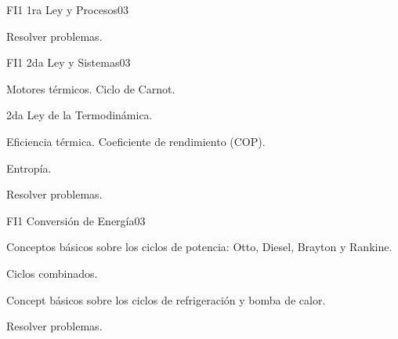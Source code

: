 \begin{syllabus}
\begin{unit}{FI1 1ra Ley y Procesos}{}{0}{3}
   \begin{learningoutcomes}
      \item Resolver problemas.
   \end{learningoutcomes}
\end{unit}

\begin{unit}{FI1 2da Ley y Sistemas}{}{0}{3}
\begin{topics}
      \item Motores térmicos. Ciclo de Carnot.
      \item 2da Ley de la Termodinámica.
      \item Eficiencia térmica. Coeficiente de rendimiento (COP).
      \item Entropía.
      
%       
   \end{topics}

   \begin{learningoutcomes}
      \item Resolver problemas.
   \end{learningoutcomes}
\end{unit}

\begin{unit}{FI1 Conversión de Energía}{}{0}{3}
\begin{topics}
      \item Conceptos básicos sobre los ciclos de potencia: Otto, Diesel, Brayton y Rankine.
      \item Ciclos combinados.
      \item Concept básicos sobre los ciclos de refrigeración y bomba de calor.
     
     
   \end{topics}

   \begin{learningoutcomes}
      \item Resolver problemas.
   \end{learningoutcomes}
\end{unit}



\begin{coursebibliography}
\end{coursebibliography}

\end{syllabus}
